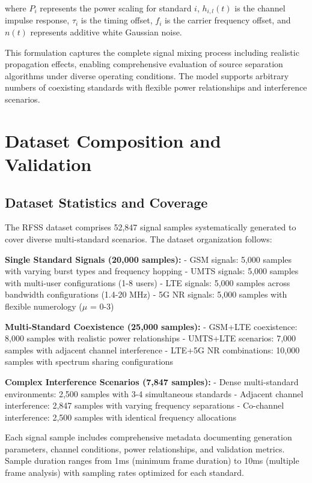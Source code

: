 \documentclass[twocolumn]{article}
\begin{document}
where $P_i$ represents the power scaling for standard $i$, $h_{i,l}(t)$ is the channel impulse response, $\tau_i$ is the timing offset, $f_i$ is the carrier frequency offset, and $n(t)$ represents additive white Gaussian noise.

This formulation captures the complete signal mixing process including realistic propagation effects, enabling comprehensive evaluation of source separation algorithms under diverse operating conditions. The model supports arbitrary numbers of coexisting standards with flexible power relationships and interference scenarios.

\section{Dataset Composition and Validation}

\subsection{Dataset Statistics and Coverage}

The RFSS dataset comprises 52,847 signal samples systematically generated to cover diverse multi-standard scenarios. The dataset organization follows:

\textbf{Single Standard Signals (20,000 samples):}
- GSM signals: 5,000 samples with varying burst types and frequency hopping
- UMTS signals: 5,000 samples with multi-user configurations (1-8 users)  
- LTE signals: 5,000 samples across bandwidth configurations (1.4-20 MHz)
- 5G NR signals: 5,000 samples with flexible numerology ($\mu$ = 0-3)

\textbf{Multi-Standard Coexistence (25,000 samples):}
- GSM+LTE coexistence: 8,000 samples with realistic power relationships
- UMTS+LTE scenarios: 7,000 samples with adjacent channel interference
- LTE+5G NR combinations: 10,000 samples with spectrum sharing configurations

\textbf{Complex Interference Scenarios (7,847 samples):}
- Dense multi-standard environments: 2,500 samples with 3-4 simultaneous standards
- Adjacent channel interference: 2,847 samples with varying frequency separations
- Co-channel interference: 2,500 samples with identical frequency allocations

Each signal sample includes comprehensive metadata documenting generation parameters, channel conditions, power relationships, and validation metrics. Sample duration ranges from 1ms (minimum frame duration) to 10ms (multiple frame analysis) with sampling rates optimized for each standard.
\end{document}
